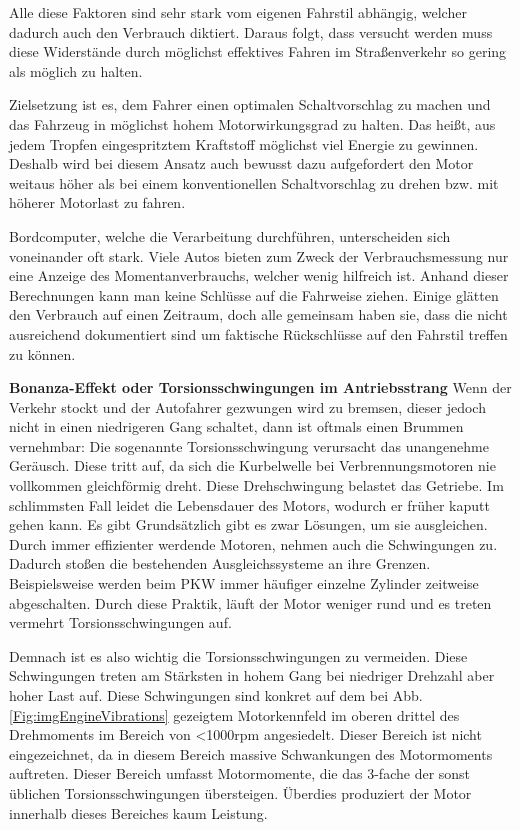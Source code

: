 Alle diese Faktoren sind sehr stark vom eigenen Fahrstil abhängig, welcher dadurch auch den Verbrauch diktiert. Daraus folgt, dass versucht werden muss diese Widerstände durch möglichst effektives Fahren im Straßenverkehr so gering als möglich zu halten.

Zielsetzung ist es, dem Fahrer einen optimalen Schaltvorschlag zu machen und das Fahrzeug in möglichst hohem Motorwirkungsgrad zu halten. Das heißt, aus jedem Tropfen eingespritztem Kraftstoff möglichst viel Energie zu gewinnen. Deshalb wird bei diesem Ansatz auch bewusst dazu aufgefordert den Motor weitaus höher als bei einem konventionellen Schaltvorschlag zu drehen bzw. mit höherer Motorlast zu fahren.
 
Bordcomputer, welche die Verarbeitung durchführen, unterscheiden sich voneinander oft stark. Viele Autos bieten zum Zweck der Verbrauchsmessung nur eine Anzeige des Momentanverbrauchs, welcher wenig hilfreich ist. Anhand dieser Berechnungen kann man keine Schlüsse auf die Fahrweise ziehen. Einige glätten den Verbrauch auf einen Zeitraum, doch alle gemeinsam haben sie, dass die nicht ausreichend dokumentiert sind um faktische Rückschlüsse auf den Fahrstil treffen zu können.

\textbf{Bonanza-Effekt oder Torsionsschwingungen im Antriebsstrang\nextline}
\cite{SIMR.CH2-motorwirkungsgrad.Motorschwingungen}
Wenn der Verkehr stockt und der Autofahrer gezwungen wird zu bremsen, dieser jedoch nicht in einen niedrigeren Gang schaltet, dann ist oftmals einen Brummen vernehmbar: Die sogenannte Torsionsschwingung verursacht das unangenehme Geräusch. Diese tritt auf, da sich die Kurbelwelle bei Verbrennungsmotoren nie vollkommen gleichförmig dreht. Diese Drehschwingung belastet das Getriebe. Im schlimmsten Fall leidet die Lebensdauer des Motors, wodurch er früher kaputt gehen kann. Es gibt Grundsätzlich gibt es zwar Lösungen, um sie ausgleichen. Durch immer effizienter werdende Motoren, nehmen auch die Schwingungen zu. Dadurch stoßen die bestehenden Ausgleichssysteme an ihre Grenzen. Beispielsweise werden beim PKW immer häufiger einzelne Zylinder zeitweise abgeschalten. Durch diese Praktik, läuft der Motor weniger rund und es treten vermehrt Torsionsschwingungen auf. 

Demnach ist es also wichtig die Torsionsschwingungen zu vermeiden. Diese Schwingungen treten am Stärksten in hohem Gang bei niedriger Drehzahl aber hoher Last auf. Diese Schwingungen sind konkret auf dem bei Abb. \ref{Fig:imgEngineVibrations} gezeigtem Motorkennfeld im oberen drittel des Drehmoments im Bereich von <1000rpm angesiedelt. Dieser Bereich ist nicht eingezeichnet, da in diesem Bereich massive Schwankungen des Motormoments auftreten. Dieser Bereich umfasst Motormomente, die das 3-fache der sonst üblichen Torsionsschwingungen übersteigen. Überdies produziert der Motor innerhalb dieses Bereiches kaum Leistung.

